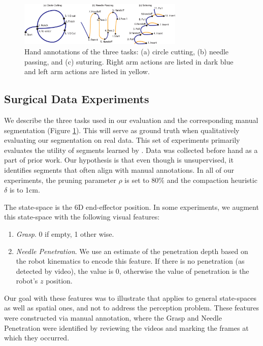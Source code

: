 \begin{figure}[t]
\centering
\includegraphics[width=0.7\textwidth]{tsc-experiments/conceptual_plots}
 \caption{Hand annotations of the three tasks: (a) circle cutting, (b) needle passing, and (c) suturing. Right arm actions are listed in dark blue and left arm actions are listed in yellow. \label{demo}}
\end{figure}

\subsection{Surgical Data Experiments}
We describe the three tasks used in our evaluation and the corresponding manual segmentation (Figure \ref{demo}).
This will serve as ground truth when qualitatively evaluating our segmentation on real data.
This set of experiments primarily evaluates the utility of segments learned by \tsc.
Data was collected before hand as a part of prior work.
Our hypothesis is that even though \tsc is unsupervised, it identifies segments that often align with manual annotations.
In all of our experiments, the pruning parameter $\rho$ is set to $80\%$ and the compaction heuristic $\delta$ is to 1cm.

The state-space is the 6D end-effector position.
In some experiments, we augment this state-space with the following visual features:
\begin{enumerate}
\item \emph{Grasp}. 0 if empty, 1 other wise.
\item \emph{Needle Penetration}. We use an estimate of the penetration depth based on the robot kinematics to encode this feature. 
If there is no penetration (as detected by video), the value is 0, otherwise the value of penetration is the robot's $z$ position.
\end{enumerate}
Our goal with these features was to illustrate that \tsc applies to general state-spaces as well as spatial ones, and not to address the perception problem.
These features were constructed via manual annotation, where the Grasp and Needle Penetration were identified by reviewing the videos and marking the frames at which they occurred.

